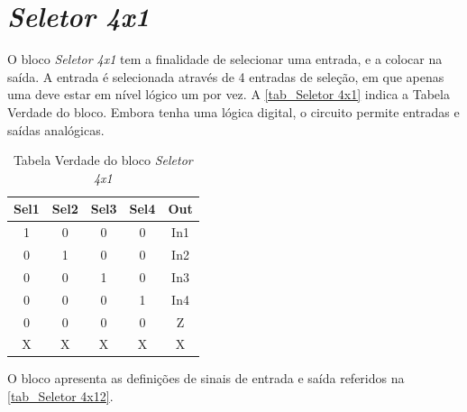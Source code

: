 \renewcommand{\NomeBloco}{\emph{Seletor 4x1}}
\renewcommand{\NomeBlocoNoIt}{Seletor 4x1}
\renewcommand{\NomePTab}{tab_\NomeBlocoNoIt}
\renewcommand{\NomeSTab}{tab_\NomeBlocoNoIt2}
\renewcommand{\NomePFig}{fig_\NomeBlocoNoIt}
\renewcommand{\NomeSFig}{fig_\NomeBlocoNoIt2}
\renewcommand{\NomeTTab}{tab_\NomeBlocoNoIt3}

\section{\NomeBloco}

O bloco \NomeBloco{} tem a finalidade de selecionar uma entrada, e a colocar na sa\'ida. A entrada \'e selecionada atrav\'es de 4 entradas de sele{\c c}\~ao, em que apenas uma deve estar em n\'ivel l\'ogico um por vez. A \autoref{\NomePTab} indica a Tabela Verdade do bloco. Embora tenha uma l\'ogica digital, o circuito permite entradas e sa\'idas anal\'ogicas.

\begin{table}[htbp]

\caption{Tabela Verdade do bloco \NomeBloco}%
\label{\NomePTab}
\centering
\begin{tabular}{ccccc}
    \toprule
    Sel1 & Sel2 & Sel3 & Sel4 & Out \\
    \midrule \midrule
    1 & 0 & 0 & 0 & In1 \\
    \midrule
    0 & 1 & 0 & 0 & In2 \\
    \midrule
    0 & 0 & 1 & 0 & In3 \\
    \midrule
    0 & 0 & 0 & 1 & In4 \\
    \midrule
    0 & 0 & 0 & 0 & Z \\
    \midrule
    X & X & X & X & X \\
\bottomrule

\end{tabular}
\end{table}

O bloco apresenta as defini{\c c}\~oes de sinais de entrada e sa\'ida referidos na \autoref{\NomeSTab}.

